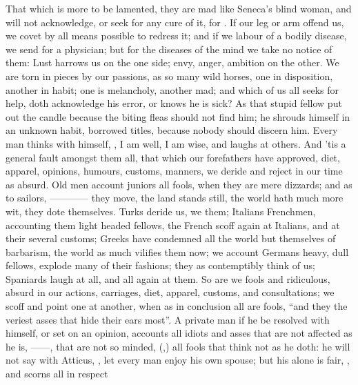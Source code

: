 That which is more to be lamented, they are mad like Seneca's blind woman, and
will not acknowledge, or seek for any cure of it, for
. If our leg or arm offend us, we
covet by all means possible to redress it; and if we labour
of a bodily disease, we send for a physician; but for the diseases of the mind
we take no notice of them: Lust harrows us on the one side;
envy, anger, ambition on the other. We are torn in pieces by our passions, as
so many wild horses, one in disposition, another in habit; one is melancholy,
another mad; and which of us all seeks for help, doth
acknowledge his error, or knows he is sick? As that stupid fellow put out the
candle because the biting fleas should not find him; he shrouds himself in an
unknown habit, borrowed titles, because nobody should discern him. Every man
thinks with himself, , I am well, I am wise, and
laughs at others. And 'tis a general fault amongst them all, that
which our forefathers have approved, diet, apparel,
opinions, humours, customs, manners, we deride and reject in our time as
absurd. Old men account juniors all fools, when they are mere dizzards; and as
to sailors, ------------ they move, the land
stands still, the world hath much more wit, they dote themselves. Turks deride
us, we them; Italians Frenchmen, accounting them light headed fellows, the
French scoff again at Italians, and at their several customs; Greeks have
condemned all the world but themselves of barbarism, the world as much vilifies
them now; we account Germans heavy, dull fellows, explode many of their
fashions; they as contemptibly think of us; Spaniards laugh at all, and all
again at them. So are we fools and ridiculous, absurd in our actions,
carriages, diet, apparel, customs, and consultations; we
scoff and point one at another, when as in conclusion all
are fools, \enquote{and they the veriest asses that hide their ears
most}. A private man if he be resolved with himself, or set on an opinion,
accounts all idiots and asses that are not affected as he is,
------, that
are not so minded, (,) all fools that think not as he doth: he will not say with
Atticus, , let every man enjoy his own
spouse; but his alone is fair, , \etc{} and scorns all in respect
